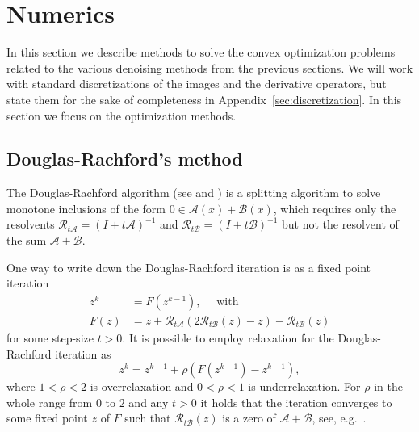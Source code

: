 \documentclass[twocolumn,envcountsame]{svjour3}
\newcommand{\MA}{\mathcal{A}}
\newcommand{\MB}{\mathcal{B}}
\newcommand{\MR}{\mathcal{R}}
\begin{document}
\section{Numerics}
\label{sec:numerics}

In this section we describe methods to solve the convex optimization problems related to the various denoising methods from the previous sections.
We will work with standard discretizations of the images and the derivative operators, but state
them for the sake of completeness in Appendix~\ref{sec:discretization}.
In this section we focus on the optimization methods.

\subsection{Douglas-Rachford's method}
\label{sec:dr}
The Douglas-Rachford algorithm (see \cite{douglasrachford1956} and \cite{lions1979splitting}) is a splitting algorithm to solve monotone inclusions of the form
$0\in\MA(x)+\MB(x)$, which requires only the resolvents
$\MR_{t\MA} = (I+t\MA)^{-1}$ and $\MR_{t\MB}=(I+t\MB)^{-1}$ but not the resolvent of the sum
$\MA+\MB$.

One way to write down the Douglas-Rachford iteration is as a fixed point iteration
\begin{align*}
  z^k&=F(z^{k-1}),\quad\text{ with}\\
  F(z)&= z+\MR_{t\mathcal{A}}(2\MR_{t\MB}(z)-z)-\MR_{t\MB}(z)
\end{align*}
for some step-size $t>0$.
It is possible to employ relaxation for the Douglas-Rachford iteration as
\begin{equation}
  \label{DR}
  z^k=z^{k-1}+\rho(F(z^{k-1})-z^{k-1}),
  \end{equation}
  where $1<\rho<2$ is overrelaxation and $0<\rho<1$ is
  underrelaxation. For $\rho$ in the whole range from $0$ to $2$ and any $t>0$ it
  holds that the iteration converges to some fixed point $z$ of $F$
  such that $\MR_{t\MB}(z)$ is a zero of $\MA+\MB$, see,
  e.g.~\cite{eckstein1992douglas}.
\end{document}
